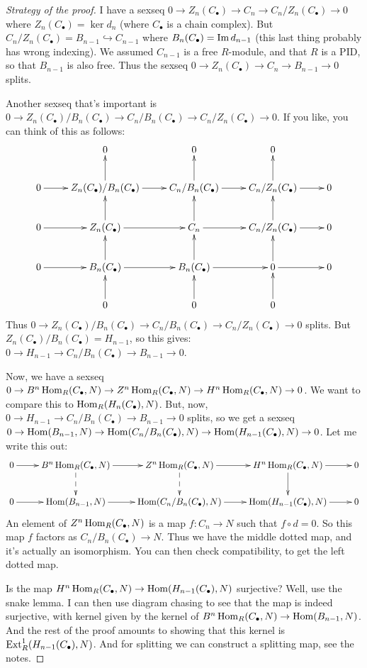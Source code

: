 \begin{proof}[Strategy of the proof]
I have a sexseq $0\to Z_n(C_\bullet)\to C_n\to C_n/Z_n(C_\bullet)\to 0$ where $Z_n(C_\bullet)=\ker d_n$ (where $C_\bullet$ is a chain complex). But $C_n/Z_n(C_\bullet)=B_{n-1}\hookrightarrow C_{n-1}$ where $B_n(C_\bullet)=\operatorname{Im} d_{n-1}$ (this last thing probably has wrong indexing). We assumed $C_{n-1}$ is a free $R$-module, and that $R$ is a PID, so that $B_{n-1}$ is also free. Thus the sexseq $0\to Z_n(C_\bullet)\to C_n\to B_{n-1}\to 0$ splits.

Another sexseq that's important is $0\to Z_n(C_\bullet)/B_n(C_\bullet)\to C_n/B_n(C_\bullet)\to C_n/Z_n(C_\bullet)\to 0$. If you like, you can think of this as follows:
\begin{equation*}
\xymatrix{
	& 0 & 0 & 0 & \\
	0\ar[r] & Z_n(C_\bullet)/B_n(C_\bullet)\ar[r]\ar[u] & C_n/B_n(C_\bullet)\ar[r]\ar[u] & C_n/Z_n(C_\bullet)\ar[r]\ar[u] & 0\\
	0\ar[r] & Z_n(C_\bullet)\ar[r]\ar[u] & C_n\ar[r]\ar[u] & C_n/Z_n(C_\bullet)\ar[r]\ar[u] & 0\\
	0\ar[r] & B_n(C_\bullet)\ar[r]\ar[u] & B_n(C_\bullet)\ar[r]\ar[u] & 0\ar[r]\ar[u] & 0\\
	& 0\ar[u] & 0\ar[u] & 0\ar[u] &
}
\end{equation*}
Thus $0\to Z_n(C_\bullet)/B_n(C_\bullet)\to C_n/B_n(C_\bullet)\to C_n/Z_n(C_\bullet)\to 0$ splits. But $Z_n(C_\bullet)/B_n(C_\bullet)= H_{n-1}$, so this gives: $0\to H_{n-1}\to C_n/B_n(C_\bullet)\to B_{n-1}\to 0$.

Now, we have a sexseq $0\to B^n\operatorname{Hom}_R(C_\bullet,N)\to Z^n\operatorname{Hom}_R(C_\bullet,N)\to H^n\operatorname{Hom}_R(C_\bullet,N)\to 0$. We want to compare this to $\operatorname{Hom}_R( H_n(C_\bullet),N)$. But, now, $0\to H_{n-1}\to C_n/B_n(C_\bullet)\to B_{n-1}\to 0$ splits, so we get a sexseq $0\to \operatorname{Hom}(B_{n-1},N)\to \operatorname{Hom}(C_n/B_n(C_\bullet),N)\to\operatorname{Hom}( H_{n-1}(C_\bullet),N)\to 0$. Let me write this out:
\begin{equation*}
\xymatrix{
	0\ar[r] & B^n\Hom_R(C_\bullet,N) \ar[r]\ar@{-->}[d] & Z^n\Hom_R(C_\bullet,N) \ar[r]\ar@{-->}[d] & H^n\Hom_R(C_\bullet,N) \ar[r]\ar[d] & 0\\
	0 \ar[r] & \Hom(B_{n-1},N) \ar[r] & \Hom(C_n/B_n(C_\bullet),N)\ar[r] & \Hom( H_{n-1}(C_\bullet),N) \ar[r] & 0
}
\end{equation*}
An element of $Z^n\operatorname{Hom}_R(C_\bullet,N)$ is a map $f:C_n\to N$ such that $f\circ d=0$. So this map $f$ factors as $C_n/B_n(C_\bullet)\to N$. Thus we have the middle dotted map, and it's actually an isomorphism. You can then check compatibility, to get the left dotted map.

Is the map $ H^n\operatorname{Hom}_R(C_\bullet,N)\to\operatorname{Hom}( H_{n-1}(C_\bullet),N)$ surjective? Well, use the snake lemma. I can then use diagram chasing to see that the map is indeed surjective, with kernel given by the kernel of $B^n\operatorname{Hom}_R(C_\bullet,N)\to \operatorname{Hom}(B_{n-1},N)$. And the rest of the proof amounts to showing that this kernel is $\operatorname{Ext}^1_R( H_{n-1}(C_\bullet),N)$. And for splitting we can construct a splitting map, see the notes.
\end{proof}
